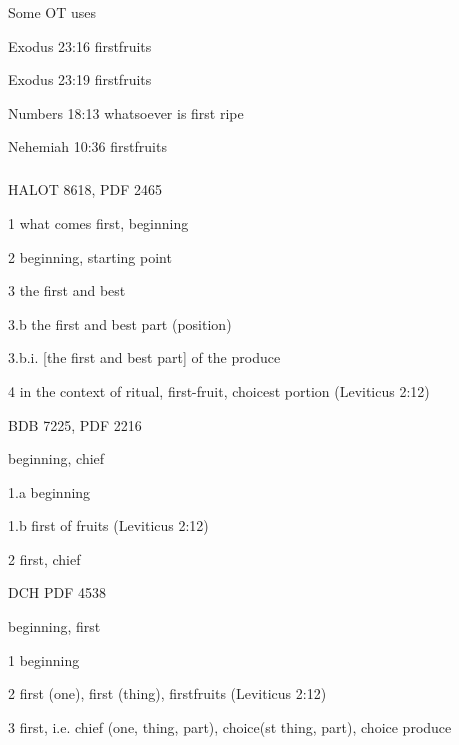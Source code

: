 				\begin{compactdesc}
					\item[Some OT uses] \textbf{}
						\begin{compactdesc}
							\item[Exodus 23:16] firstfruits
							\item[Exodus 23:19] firstfruits
							\item[Numbers 18:13] whatsoever is first ripe
							\item[Nehemiah 10:36] firstfruits
						\end{compactdesc}
				\end{compactdesc}
				
			\subparagraph{\texorpdfstring{\he{re'+siyt}}{}}
				\label{RESHIT} %
			
				\begin{compactdesc}
					\item[HALOT 8618, PDF 2465] \textbf{}
						\begin{compactitem}
							\item[1] what comes first, beginning
							\item[2] beginning, starting point
							\item[3] the first and best
							\item[3.b] the first and best part (position)
							\item[3.b.i.] [the first and best part] of the produce
							\item[4] in the context of ritual, first-fruit, choicest portion (Leviticus 2:12)
						\end{compactitem}
					\item[BDB 7225, PDF 2216] \textbf{}
						\begin{compactitem}
							\item beginning, chief
							\item[1.a] beginning
							\item[1.b] first of fruits (Leviticus 2:12) 
							\item[2] first, chief
						\end{compactitem}
					\item[DCH PDF 4538] \textbf{}
						\begin{compactitem}
							\item beginning, first
							\item[1] beginning
							\item[2] first (one), first (thing), firstfruits (Leviticus 2:12)
							\item[3] first, i.e. chief (one, thing, part), choice(st thing, part), choice produce
						\end{compactitem}
				\end{compactdesc}
				
